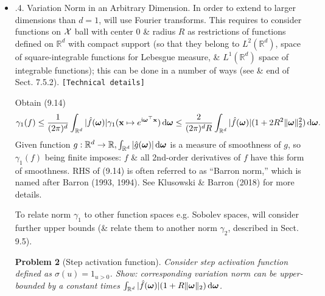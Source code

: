 \documentclass{article}
\newtheorem{problem}{Problem}
\begin{document}
\begin{enumerate}
\begin{itemize}
\begin{itemize}
\begin{itemize}
				\begin{problem}
					Assume $-R = x_1 < \cdots < x_n = R,y_1,\ldots,y_n\in\mathbb{R}$, show: piecewise-affine interpolant on $[-R,R]$ is a minimum norm interpolant.
				\end{problem}
				
				\item {.4. Variation Norm in an Arbitrary Dimension.} In order to extend to larger dimensions than $d = 1$, will use Fourier transforms. This requires to consider functions on ${\cal X}$ ball with center 0 \& radius $R$ as restrictions of functions defined on $\mathbb{R}^d$ with compact support (so that they belong to $L^2(\mathbb{R}^d)$, space of square-integrable functions for Lebesgue measure, \& $L^1(\mathbb{R}^d)$ space of integrable functions); this can be done in a number of ways (see \cite{Rudin1987} \& end of Sect. 7.5.2). {\tt[Technical details]}
				
				Obtain (9.14)
				\begin{equation}
					\gamma_1(f)\le\frac{1}{(2\pi)^d}\int_{\mathbb{R}^d} |\hat{f}(\boldsymbol{\omega})|\gamma_1({\bf x}\mapsto e^{{\rm i}\boldsymbol{\omega}^\top{\bf x}})\,{\rm d}\boldsymbol{\omega}\le\frac{2}{(2\pi)^dR}\int_{\mathbb{R}^d} |\hat{f}(\boldsymbol{\omega})|(1 + 2R^2\|\boldsymbol{\omega}\|_2^2)\,{\rm d}\boldsymbol{\omega}.
				\end{equation}
				Given function $g:\mathbb{R}^d\to\mathbb{R},\int_{\mathbb{R}^d} |\hat{g}(\boldsymbol{\omega})|\,{\rm d}\boldsymbol{\omega}$ is a measure of smoothness of $g$, so $\gamma_1(f)$ being finite imposes: $f$ \& all 2nd-order derivatives of $f$ have this form of smoothness. RHS of (9.14) is often referred to as ``Barron norm,'' which is named after Barron (1993, 1994). See Klusowski \& Barron (2018) for more details.
				
				To relate norm $\gamma_1$ to other function spaces e.g. Sobolev spaces, will consider further upper bounds (\& relate them to another norm $\gamma_2$, described in Sect. 9.5).
				
				\begin{problem}[Step activation function]
					Consider step activation function defined as $\sigma(u) = 1_{u > 0}$. Show: corresponding variation norm can be upper-bounded by a constant times $\int_{\mathbb{R}^d} |\hat{f}(\boldsymbol{\omega})|(1 + R\|\boldsymbol{\omega}\|_2)\,{\rm d}\boldsymbol{\omega}$.
				\end{problem}
				

\end{itemize}
\end{itemize}
\end{itemize}
\end{enumerate}
\end{document}
